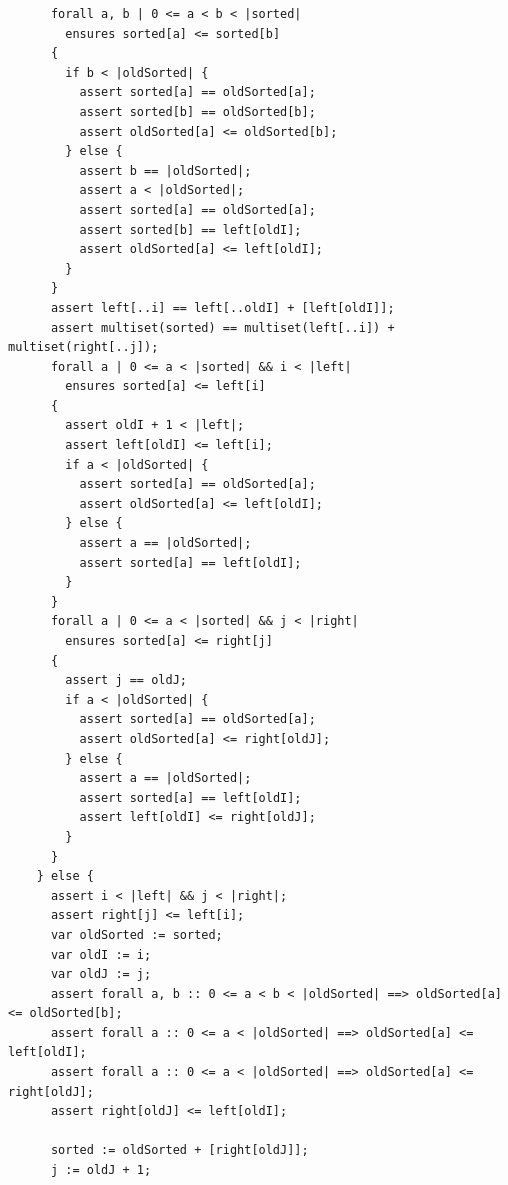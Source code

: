 \documentclass{article}
\begin{document}
\begin{lstlisting}
      forall a, b | 0 <= a < b < |sorted|
        ensures sorted[a] <= sorted[b]
      {
        if b < |oldSorted| {
          assert sorted[a] == oldSorted[a];
          assert sorted[b] == oldSorted[b];
          assert oldSorted[a] <= oldSorted[b];
        } else {
          assert b == |oldSorted|;
          assert a < |oldSorted|;
          assert sorted[a] == oldSorted[a];
          assert sorted[b] == left[oldI];
          assert oldSorted[a] <= left[oldI];
        }
      }
      assert left[..i] == left[..oldI] + [left[oldI]];
      assert multiset(sorted) == multiset(left[..i]) + multiset(right[..j]);
      forall a | 0 <= a < |sorted| && i < |left|
        ensures sorted[a] <= left[i]
      {
        assert oldI + 1 < |left|;
        assert left[oldI] <= left[i];
        if a < |oldSorted| {
          assert sorted[a] == oldSorted[a];
          assert oldSorted[a] <= left[oldI];
        } else {
          assert a == |oldSorted|;
          assert sorted[a] == left[oldI];
        }
      }
      forall a | 0 <= a < |sorted| && j < |right|
        ensures sorted[a] <= right[j]
      {
        assert j == oldJ;
        if a < |oldSorted| {
          assert sorted[a] == oldSorted[a];
          assert oldSorted[a] <= right[oldJ];
        } else {
          assert a == |oldSorted|;
          assert sorted[a] == left[oldI];
          assert left[oldI] <= right[oldJ];
        }
      }
    } else {
      assert i < |left| && j < |right|;
      assert right[j] <= left[i];
      var oldSorted := sorted;
      var oldI := i;
      var oldJ := j;
      assert forall a, b :: 0 <= a < b < |oldSorted| ==> oldSorted[a] <= oldSorted[b];
      assert forall a :: 0 <= a < |oldSorted| ==> oldSorted[a] <= left[oldI];
      assert forall a :: 0 <= a < |oldSorted| ==> oldSorted[a] <= right[oldJ];
      assert right[oldJ] <= left[oldI];

      sorted := oldSorted + [right[oldJ]];
      j := oldJ + 1;


\end{lstlisting}
\end{document}
